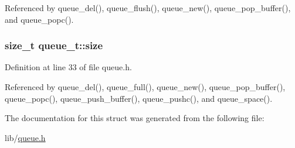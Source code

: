 Referenced by queue\+\_\+del(), queue\+\_\+flush(), queue\+\_\+new(), queue\+\_\+pop\+\_\+buffer(), and queue\+\_\+popc().

\subsubsection[{\texorpdfstring{size}{size}}]{\setlength{\rightskip}{0pt plus 5cm}size\+\_\+t queue\+\_\+t\+::size}\hypertarget{structqueue__t_a83a13b888f9d4ef127d706559818b779}{}\label{structqueue__t_a83a13b888f9d4ef127d706559818b779}


Definition at line 33 of file queue.\+h.



Referenced by queue\+\_\+del(), queue\+\_\+full(), queue\+\_\+new(), queue\+\_\+pop\+\_\+buffer(), queue\+\_\+popc(), queue\+\_\+push\+\_\+buffer(), queue\+\_\+pushc(), and queue\+\_\+space().



The documentation for this struct was generated from the following file\+:\begin{DoxyCompactItemize}
\item 
lib/\hyperlink{queue_8h}{queue.\+h}\end{DoxyCompactItemize}
